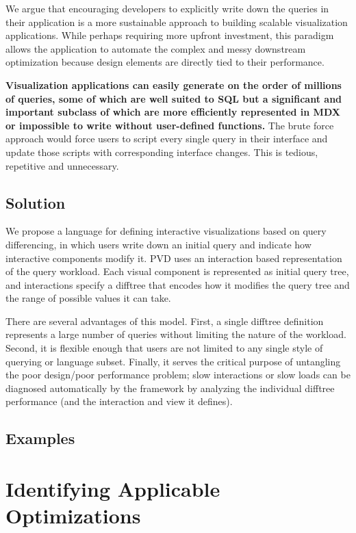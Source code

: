 We argue that encouraging developers to explicitly write down the queries in their application is a more sustainable approach to building scalable visualization applications. While perhaps requiring more upfront investment, this paradigm allows the application to automate the complex and messy downstream optimization because design elements are directly tied to their performance. 

\textbf{Visualization applications can easily generate on the order of millions of queries, some of which are well suited to SQL but a significant and important subclass of which are more efficiently represented in MDX or impossible to write without user-defined functions. }The brute force approach would force users to script every single query in their interface and update those scripts with corresponding interface changes. This is tedious, repetitive and unnecessary.

\subsection{Solution}
We propose a language for defining interactive visualizations based on query differencing, in which users write down an initial query and indicate how interactive components modify it. PVD uses an interaction based representation of the query workload. Each visual component is represented as initial query tree, and interactions specify a difftree that encodes how it modifies the query tree and the range of possible values it can take. 

There are several advantages of this model. First, a single difftree definition represents a large number of queries without limiting the nature of the workload. Second, it is flexible enough that users are not limited to any single style of querying or language subset. Finally, it serves the critical purpose of untangling the poor design/poor performance problem;  slow interactions or slow loads can be diagnosed automatically by the framework by analyzing the individual difftree performance (and the interaction and view it defines).

\subsection{Examples}

\section{Identifying Applicable Optimizations}
